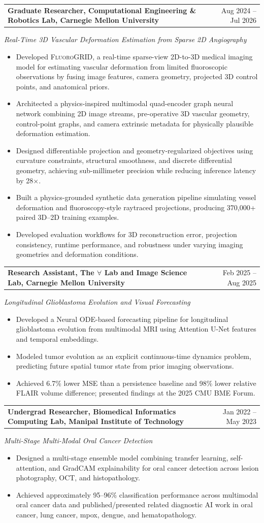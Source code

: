 \documentclass[letterpaper,10pt]{article}
\newcommand{\cvItem}[1]{\item\small{#1}}
\newcommand{\cvProjectHeading}[2]{
  \vspace{2pt}
  \begin{tabularx}{\textwidth}{X r}
    \textbf{#1} & \small #2 \\
  \end{tabularx}
  \vspace{-2pt}
}
\newcommand{\cvItemListStart}{
  \begin{itemize}[leftmargin=0.16in, itemsep=1.5pt, parsep=0pt, topsep=2pt]
}
\newcommand{\cvItemListEnd}{
  \end{itemize}
  \vspace{2pt}
}
\begin{document}
\cvProjectHeading
  {Graduate Researcher, Computational Engineering \& Robotics Lab, Carnegie Mellon University}{Aug 2024 -- Jul 2026}
\textit{\small Real-Time 3D Vascular Deformation Estimation from Sparse 2D Angiography}
\cvItemListStart
  \cvItem{Developed \textsc{FluoroGRID}, a real-time sparse-view 2D-to-3D medical imaging model for estimating vascular deformation from limited fluoroscopic observations by fusing image features, camera geometry, projected 3D control points, and anatomical priors.}
  \cvItem{Architected a physics-inspired multimodal quad-encoder graph neural network combining 2D image streams, pre-operative 3D vascular geometry, control-point graphs, and camera extrinsic metadata for physically plausible deformation estimation.}
  \cvItem{Designed differentiable projection and geometry-regularized objectives using curvature constraints, structural smoothness, and discrete differential geometry, achieving sub-millimeter precision while reducing inference latency by 28$\times$.}
  \cvItem{Built a physics-grounded synthetic data generation pipeline simulating vessel deformation and fluoroscopy-style raytraced projections, producing 370,000+ paired 3D--2D training examples.}
  \cvItem{Developed evaluation workflows for 3D reconstruction error, projection consistency, runtime performance, and robustness under varying imaging geometries and deformation conditions.}
\cvItemListEnd

\cvProjectHeading
  {Research Assistant, The $\forall$ Lab and Image Science Lab, Carnegie Mellon University}{Feb 2025 -- Aug 2025}
\textit{\small Longitudinal Glioblastoma Evolution and Visual Forecasting}
\cvItemListStart
  \cvItem{Developed a Neural ODE-based forecasting pipeline for longitudinal glioblastoma evolution from multimodal MRI using Attention U-Net features and temporal embeddings.}
  \cvItem{Modeled tumor evolution as an explicit continuous-time dynamics problem, predicting future spatial tumor state from prior imaging observations.}
  \cvItem{Achieved 6.7\% lower MSE than a persistence baseline and 98\% lower relative FLAIR volume difference; presented findings at the 2025 CMU BME Forum.}
\cvItemListEnd

\cvProjectHeading
  {Undergrad Researcher, Biomedical Informatics Computing Lab,  Manipal Institute of Technology}{Jan 2022 -- May 2023}
\textit{\small Multi-Stage Multi-Modal Oral Cancer Detection}
\cvItemListStart
  \cvItem{Designed a multi-stage ensemble model combining transfer learning, self-attention, and GradCAM explainability for oral cancer detection across lesion photography, OCT, and histopathology.}
  \cvItem{Achieved approximately 95--96\% classification performance across multimodal oral cancer data and published/presented related diagnostic AI work in oral cancer, lung cancer, mpox, dengue, and hematopathology.}
\cvItemListEnd
\end{document}
